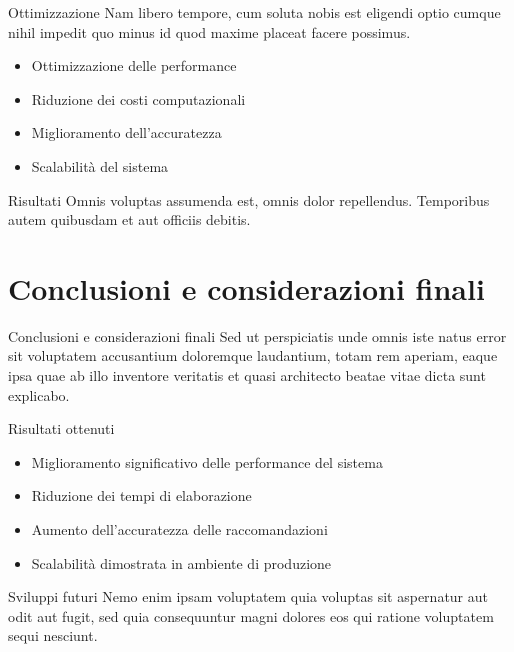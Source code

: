 \documentclass{beamer}
\begin{document}
	\begin{frame}{Ottimizzazione}
		Nam libero tempore, cum soluta nobis est eligendi optio cumque nihil impedit quo minus id quod maxime placeat facere possimus.

		\begin{itemize}
			\item Ottimizzazione delle performance
			\item Riduzione dei costi computazionali
			\item Miglioramento dell'accuratezza
			\item Scalabilità del sistema
		\end{itemize}

		\begin{exampleblock}{Risultati}
			Omnis voluptas assumenda est, omnis dolor repellendus. Temporibus autem quibusdam et aut officiis debitis.
		\end{exampleblock}
	\end{frame}


	\section{Conclusioni e considerazioni finali}

	\begin{frame}{Conclusioni e considerazioni finali}
		Sed ut perspiciatis unde omnis iste natus error sit voluptatem accusantium doloremque laudantium, totam rem aperiam, eaque ipsa quae ab illo inventore veritatis et quasi architecto beatae vitae dicta sunt explicabo.

		\begin{block}{Risultati ottenuti}
			\begin{itemize}
				\item Miglioramento significativo delle performance del sistema
				\item Riduzione dei tempi di elaborazione
				\item Aumento dell'accuratezza delle raccomandazioni
				\item Scalabilità dimostrata in ambiente di produzione
			\end{itemize}
		\end{block}

		\begin{alertblock}{Sviluppi futuri}
			Nemo enim ipsam voluptatem quia voluptas sit aspernatur aut odit aut fugit, sed quia consequuntur magni dolores eos qui ratione voluptatem sequi nesciunt.
		\end{alertblock}
	\end{frame}
\end{document}
